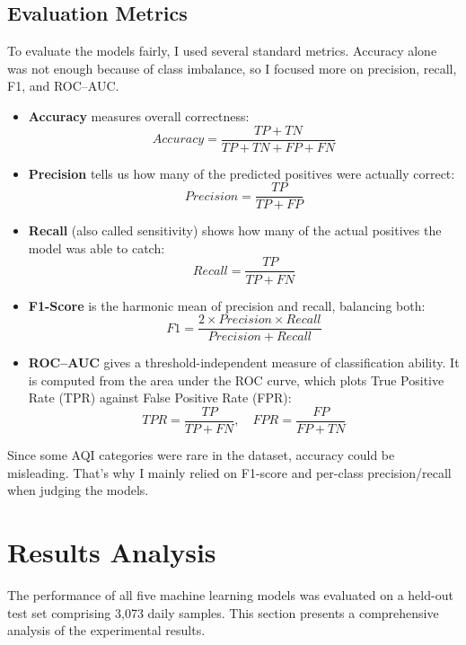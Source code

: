 \documentclass[a4paper,fleqn]{cas-dc}
\begin{document}
\subsection{Evaluation Metrics}
To evaluate the models fairly, I used several standard metrics. Accuracy alone was not enough because of class imbalance, so I focused more on precision, recall, F1, and ROC--AUC.

\begin{itemize}
    \item \textbf{Accuracy} measures overall correctness:
    \[
    Accuracy = \frac{TP + TN}{TP + TN + FP + FN}
    \]

    \item \textbf{Precision} tells us how many of the predicted positives were actually correct:
    \[
    Precision = \frac{TP}{TP + FP}
    \]

    \item \textbf{Recall} (also called sensitivity) shows how many of the actual positives the model was able to catch:
    \[
    Recall = \frac{TP}{TP + FN}
    \]

    \item \textbf{F1-Score} is the harmonic mean of precision and recall, balancing both:
    \[
    F1 = \frac{2 \times Precision \times Recall}{Precision + Recall}
    \]

    \item \textbf{ROC--AUC} gives a threshold-independent measure of classification ability. It is computed from the area under the ROC curve, which plots True Positive Rate (TPR) against False Positive Rate (FPR):
    \[
    TPR = \frac{TP}{TP + FN}, \quad FPR = \frac{FP}{FP + TN}
    \]
\end{itemize}

Since some AQI categories were rare in the dataset, accuracy could be misleading. That’s why I mainly relied on F1-score and per-class precision/recall when judging the models.







\section{Results Analysis}

The performance of all five machine learning models was evaluated on a held-out test set comprising 3,073 daily samples. This section presents a comprehensive analysis of the experimental results.
\end{document}
